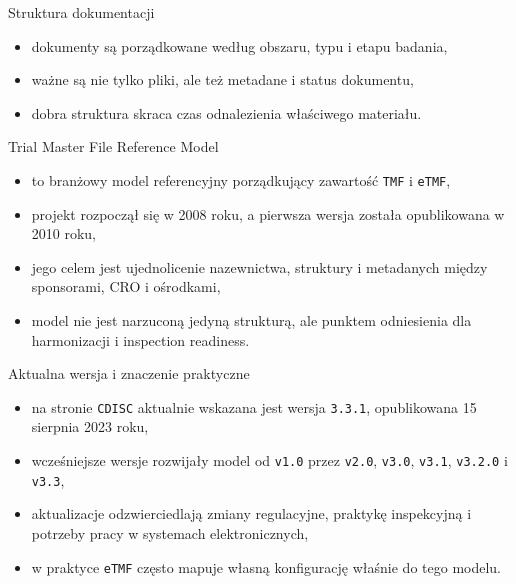 \begin{frame}{Struktura dokumentacji}
  \begin{itemize}
    \item dokumenty są porządkowane według obszaru, typu i etapu badania,
    \item ważne są nie tylko pliki, ale też metadane i status dokumentu,
    \item dobra struktura skraca czas odnalezienia właściwego materiału.
  \end{itemize}
\end{frame}

\begin{frame}{Trial Master File Reference Model}
  \begin{itemize}
    \item to branżowy model referencyjny porządkujący zawartość \texttt{TMF} i \texttt{eTMF},
    \item projekt rozpoczął się w 2008 roku, a pierwsza wersja została opublikowana w 2010 roku,
    \item jego celem jest ujednolicenie nazewnictwa, struktury i metadanych między sponsorami, CRO i ośrodkami,
    \item model nie jest narzuconą jedyną strukturą, ale punktem odniesienia dla harmonizacji i inspection readiness.
  \end{itemize}
\end{frame}

\begin{frame}{Aktualna wersja i znaczenie praktyczne}
  \begin{itemize}
    \item na stronie \texttt{CDISC} aktualnie wskazana jest wersja \texttt{3.3.1}, opublikowana 15 sierpnia 2023 roku,
    \item wcześniejsze wersje rozwijały model od \texttt{v1.0} przez \texttt{v2.0}, \texttt{v3.0}, \texttt{v3.1}, \texttt{v3.2.0} i \texttt{v3.3},
    \item aktualizacje odzwierciedlają zmiany regulacyjne, praktykę inspekcyjną i potrzeby pracy w systemach elektronicznych,
    \item w praktyce \texttt{eTMF} często mapuje własną konfigurację właśnie do tego modelu.
  \end{itemize}
\end{frame}

